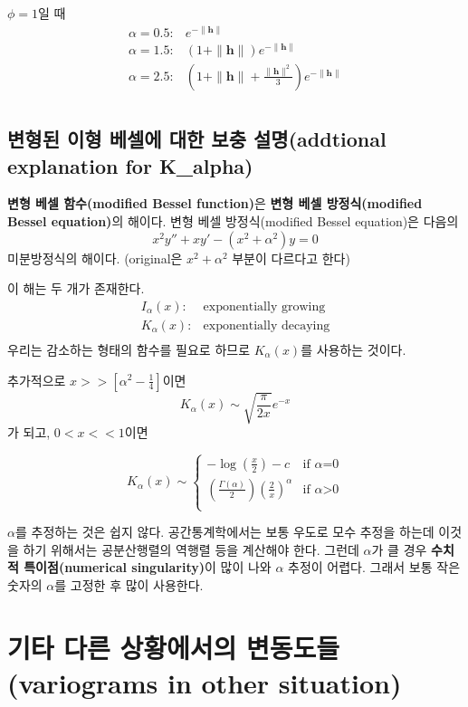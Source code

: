 \documentclass[b5paper,]{scrbook}
\theoremstyle{plain}
\theoremstyle{definition}
\numberwithin{equation}{section}
\begin{document}
\(\phi=1\)일 때 \[
\begin{array}{ll}
\alpha=0.5: & e^{-\|\mathbf{h}\|}\\
\alpha=1.5: & (1+\|\mathbf{h}\|)e^{-\|\mathbf{h}\|}\\
\alpha=2.5: & (1+\|\mathbf{h}\| + \frac{\|\mathbf{h}\|^{2}}{3})e^{-\|\mathbf{h}\|}\\
\end{array}
\]

\subsection{변형된 이형 베셀에 대한 보충 설명(addtional explanation for
K\_alpha)}\label{-----addtional-explanation-for-k_alpha}

\textbf{변형 베셀 함수(modified Bessel function)}은 \textbf{변형 베셀
방정식(modified Bessel equation)}의 해이다. 변형 베셀 방정식(modified
Bessel equation)은 다음의 \[x^{2}y''+xy'-(x^{2}+\alpha^{2})y=0\]
미분방정식의 해이다. (original은 \(x^{2}+\alpha^{2}\) 부분이 다르다고
한다)

이 해는 두 개가 존재한다. \[
\begin{array}{ll}
I_{\alpha}(x): & \text{exponentially growing}\\
K_{\alpha}(x): & \text{exponentially decaying}\\
\end{array}
\] 우리는 감소하는 형태의 함수를 필요로 하므로 \(K_{\alpha}(x)\)를
사용하는 것이다.

추가적으로 \(x >> [\alpha^{2}-\frac{1}{4}]\)이면
\[K_{\alpha}(x) \sim \sqrt{\frac{\pi}{2x}}e^{-x}\] 가 되고,
\(0<x<<1\)이면

\[
K_{\alpha}(x) \sim \left\{ \begin{array}{ll}
-\log (\frac{x}{2}) - c & \textrm{if $\alpha$=0}\\
(\frac{\Gamma(\alpha)}{2})(\frac{2}{x})^{\alpha} & \textrm{if $\alpha$>0}\\
\end{array} \right.
\]

\(\alpha\)를 추정하는 것은 쉽지 않다. 공간통계학에서는 보통 우도로 모수
추정을 하는데 이것을 하기 위해서는 공분산행렬의 역행렬 등을 계산해야
한다. 그런데 \(\alpha\)가 클 경우 \textbf{수치적 특이점(numerical
singularity)}이 많이 나와 \(\alpha\) 추정이 어렵다. 그래서 보통 작은
숫자의 \(\alpha\)를 고정한 후 많이 사용한다.

\section{기타 다른 상황에서의 변동도들(variograms in other
situation)}\label{---variograms-in-other-situation}
\end{document}
